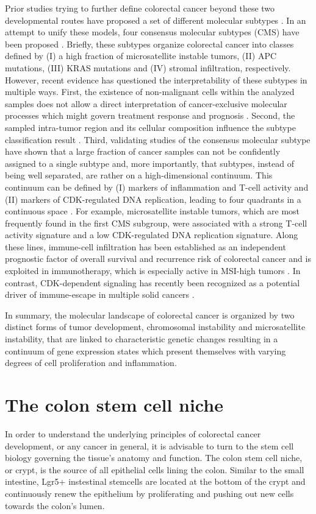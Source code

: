 \begin{flushleft}
Prior studies trying to further define colorectal cancer beyond these two developmental routes have proposed a set of different molecular subtypes \cite{Menter}. In an attempt to unify these models, four consensus molecular subtypes (CMS) have been proposed \cite{Guinney2015TheCancer.}. Briefly, these subtypes organize colorectal cancer into classes defined by (I) a high fraction of microsatellite instable tumors, (II) APC mutations, (III) KRAS mutations and (IV) stromal infiltration, respectively. However, recent evidence has questioned the interpretability of these subtypes in multiple ways. First, the existence of non-malignant cells within the analyzed samples does not allow a direct interpretation of cancer-exclusive molecular processes which might govern treatment response and prognosis \cite{Dunne}. Second, the sampled intra-tumor region and its cellular composition influence the subtype classification result \cite{Dunne2016ChallengingCancer.}. Third, validating studies of the consensus molecular subtype have shown that a large fraction of cancer samples can not be confidently assigned to a single subtype and, more importantly, that subtypes, instead of being well separated, are rather on a high-dimensional continuum. This continuum can be defined by (I) markers of inflammation and T-cell activity and (II) markers of CDK-regulated DNA replication, leading to four quadrants in a continuous space \cite{Ma}. For example, microsatellite instable tumors, which are most frequently found in the first CMS subgroup, were associated with a strong T-cell activity signature and a low CDK-regulated DNA replication signature. Along these lines, immune-cell infiltration has been established as an independent prognostic factor of overall survival and recurrence risk of colorectal cancer and is exploited in immunotherapy, which is especially active in MSI-high tumors \cite{galon, pages}. In contrast, CDK-dependent signaling has recently been recognized as a potential driver of immune-escape in multiple solid cancers \cite{Chaikovsky1}. \par 

In summary, the molecular landscape of colorectal cancer is organized by two distinct forms of tumor development, chromosomal instability and microsatellite instability, that are linked to characteristic genetic changes resulting in a continuum of gene expression states which present themselves with varying degrees of cell proliferation and inflammation. \par

\section{The colon stem cell niche}
In order to understand the underlying principles of colorectal cancer development, or any cancer in general, it is advisable to turn to the stem cell biology governing the tissue's anatomy and function. The colon stem cell niche, or crypt, is the source of all epithelial cells lining the colon. Similar to the small intestine, Lgr5+ instestinal stemcells are located at the bottom of the crypt and continuously renew the epithelium by proliferating and pushing out new cells towards the colon's lumen.


\end{flushleft}
